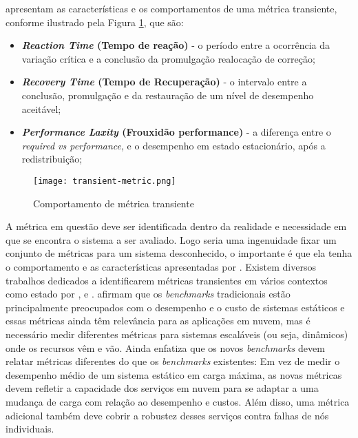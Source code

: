  apresentam as características e os comportamentos de uma métrica transiente, conforme ilustrado pela Figura \ref{fig:transient-metric}, que são: 
\begin{itemize}
	\item \textbf{\textit{Reaction Time} (Tempo de reação)} - o período entre a ocorrência da variação crítica e a conclusão da promulgação realocação de correção;
	
	\item \textbf{\textit{Recovery Time} (Tempo de Recuperação)} - o intervalo entre a conclusão, promulgação e da restauração de um nível de desempenho aceitável;
	
	\item \textbf{\textit{Performance Laxity} (Frouxidão performance)} - a diferença entre o \textit{required vs performance}, e o desempenho em estado estacionário, após a redistribuição;
\end{itemize}


\begin{figure}[!htb]
	\centering
	\texttt{[image: transient-metric.png]}
	\caption{Comportamento de métrica transiente}
	\label{fig:transient-metric}
\end{figure}


A métrica em questão deve ser identificada dentro da realidade e necessidade em que se encontra o sistema a ser avaliado. Logo seria uma ingenuidade fixar um conjunto de métricas para um sistema desconhecido, o importante é que ela tenha o comportamento e as características apresentadas por . Existem diversos trabalhos dedicados a  identificarem métricas transientes em vários contextos como estado por ,  e .
 afirmam que os \textit{benchmarks} tradicionais estão principalmente preocupados com o desempenho e o custo de sistemas estáticos e essas métricas ainda têm relevância para as aplicações em nuvem, mas é necessário medir diferentes métricas para sistemas escaláveis (ou seja, dinâmicos) onde os recursos vêm e vão. Ainda  enfatiza que os novos \textit{benchmarks} devem relatar métricas diferentes do que os \textit{benchmarks} existentes: 
	Em vez de medir o desempenho médio de um sistema estático em carga máxima, as novas métricas devem refletir a capacidade dos serviços em nuvem para se adaptar a uma mudança de carga com relação ao desempenho e custos. Além disso, uma métrica adicional também deve cobrir a robustez desses serviços contra falhas de nós individuais.

